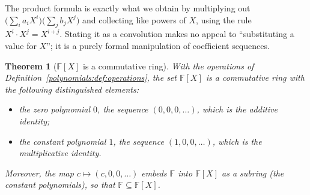 \documentclass[11pt,a4paper]{article}
\newtheorem{theorem}{Theorem}[section]
\theoremstyle{definition}
\theoremstyle{remark}
\newcommand{\F}{\ensuremath{\mathbb{F}}}
\begin{document}
The product formula is exactly what we obtain by multiplying out
\(\bigl(\sum_i a_i X^i\bigr)\bigl(\sum_j b_j X^j\bigr)\) and collecting like
powers of \(X\), using the rule \(X^i \cdot X^j = X^{i+j}\). Stating
it as a convolution makes no appeal to ``substituting a value for
\(X\)''; it is a purely formal manipulation of coefficient sequences.

\begin{theorem}[{\(\F[X]\) is a commutative ring}]\label{polynomials:thm:ring}
With the operations of Definition~\ref{polynomials:def:operations}, the set
\(\F[X]\) is a commutative ring with the following distinguished elements:
\begin{itemize}
  \item the \emph{zero polynomial} \(0\), the sequence \((0,0,0,\dots)\), which
        is the additive identity;
  \item the \emph{constant polynomial} \(1\), the sequence \((1,0,0,\dots)\),
        which is the multiplicative identity.
\end{itemize}
Moreover, the map \(c \mapsto (c,0,0,\dots)\) embeds \(\F\) into \(\F[X]\) as a
subring (the \emph{constant polynomials}), so that \(\F \subseteq \F[X]\).
\end{theorem}
\end{document}
